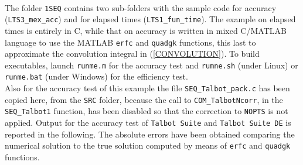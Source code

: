 \documentclass[a4paper,10pt]{report}%
\begin{document}
\\
The folder {\tt 1SEQ} contains two sub-folders with the sample code for accuracy ({\tt LTS3\_mex\_acc}) and for
elapsed times ({\tt LTS1\_fun\_time}). The example on elapsed times is entirely in C, while that on accuracy is
written in mixed C/MATLAB language to use the MATLAB {\tt erfc} and {\tt quadgk} functions, this last to approximate the
convolution integral in (\ref{CONVOLUTION}).
To build executables, launch {\tt runme.m} for the accuracy test and {\tt rumne.sh} (under Linux) or {\tt runme.bat}
(under Windows) for the efficiency test.
\\
Also for the accuracy test of this example the file {\tt SEQ\_Talbot\_pack.c} has been copied here, from the
{\tt SRC} folder, because the call to {\tt COM\_TalbotNcorr}, in the {\tt SEQ\_Talbot1} function, has been
disabled so that the correction to {\tt NOPTS} is not applied. 
Output for the accuracy test of {\tt Talbot Suite} and {\tt Talbot Suite DE} is reported in the following.
The absolute errors have been obtained comparing the numerical solution to the true solution computed by
means of {\tt erfc} and {\tt quadgk} functions.
\end{document}

